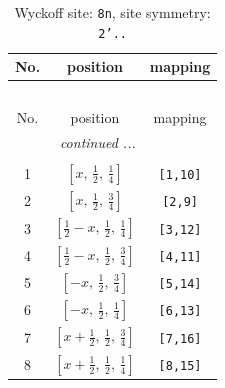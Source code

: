 \documentclass[fleqn,8pt]{jsarticle}
\begin{document}
\begin{longtable}{ccc}
\caption{Wyckoff site: {\tt 8n}, site symmetry: {\tt 2'..}}
 \\
 \hline \hline
No. & position & mapping \\ \hline \endfirsthead

\multicolumn{2}{l}{\tablename\ \thetable{}} \\
 \hline \hline
No. & position & mapping \\ \hline \endhead

 \hline \hline
\multicolumn{2}{r}{\footnotesize\it continued ...} \\ \endfoot

 \hline \hline
\multicolumn{2}{r}{} \\ \endlastfoot

1 & $\left[ x,\, \frac{1}{2},\, \frac{1}{4} \right]$ & {\tt [1,10]} \\ \hline
2 & $\left[ x,\, \frac{1}{2},\, \frac{3}{4} \right]$ & {\tt [2,9]} \\ \hline
3 & $\left[ \frac{1}{2} - x,\, \frac{1}{2},\, \frac{1}{4} \right]$ & {\tt [3,12]} \\ \hline
4 & $\left[ \frac{1}{2} - x,\, \frac{1}{2},\, \frac{3}{4} \right]$ & {\tt [4,11]} \\ \hline
5 & $\left[ - x,\, \frac{1}{2},\, \frac{3}{4} \right]$ & {\tt [5,14]} \\ \hline
6 & $\left[ - x,\, \frac{1}{2},\, \frac{1}{4} \right]$ & {\tt [6,13]} \\ \hline
7 & $\left[ x + \frac{1}{2},\, \frac{1}{2},\, \frac{3}{4} \right]$ & {\tt [7,16]} \\ \hline
8 & $\left[ x + \frac{1}{2},\, \frac{1}{2},\, \frac{1}{4} \right]$ & {\tt [8,15]} \\
\end{longtable}
\renewcommand{\arraystretch}{1.2}
\end{document}
